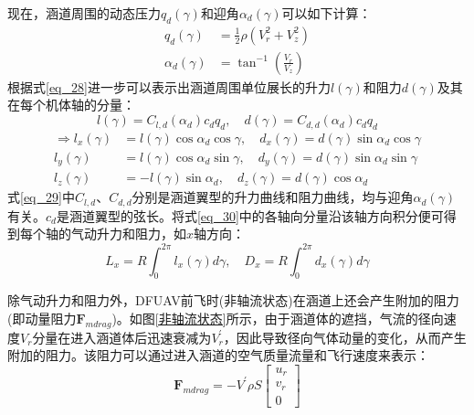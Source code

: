 现在，涵道周围的动态压力$q_d(\gamma)$和迎角$\alpha_d(\gamma)$可以如下计算：
\begin{equation}
    \begin{aligned}
        q_d(\gamma)&=\frac{1}{2}\rho\left(V_r^2+V_z^2\right)\\
        \alpha_d(\gamma)&=\tan^{-1}\left(\frac{V_r}{V_z}\right)
    \label{eq_28}
    \end{aligned}
\end{equation}
根据式\eqref{eq_28}进一步可以表示出涵道周围单位展长的升力$l(\gamma)$和阻力$d(\gamma)$及其在每个机体轴的分量：
\begin{equation}
        l(\gamma)=C_{l,d}(\alpha_d)c_dq_d, \quad
        d(\gamma)=C_{d,d}(\alpha_d)c_dq_d
    \label{eq_29}
\end{equation}
\begin{equation}
        \begin{aligned}
            \Rightarrow
        l_{x}(\gamma)&=l(\gamma)\cos\alpha_d\cos\gamma,\quad d_x(\gamma)=d(\gamma)\sin\alpha_d\cos\gamma \\
        l_{y}(\gamma)&=l(\gamma)\cos\alpha_d\sin\gamma,\quad d_y(\gamma)=d(\gamma)\sin\alpha_d\sin\gamma \\
        l_{z}(\gamma)&=-l(\gamma)\sin\alpha_d,\quad d_z(\gamma)=d(\gamma)\cos\alpha_d
        \label{eq_30}
    \end{aligned}
\end{equation}
式\eqref{eq_29}中$C_{l,d}$、$C_{d,d}$分别是涵道翼型的升力曲线和阻力曲线，均与迎角$\alpha_d(\gamma)$有关。$c_d$是涵道翼型的弦长。将式\eqref{eq_30}中的各轴向分量沿该轴方向积分便可得到每个轴的气动升力和阻力，如$x$轴方向：
\begin{equation}
    L_x=R\int_0^{2\pi}l_x(\gamma)d\gamma, \quad
    D_x=R\int_0^{2\pi}d_x(\gamma)d\gamma
    \label{eq_31}
\end{equation}

除气动升力和阻力外，DFUAV前飞时(非轴流状态)在涵道上还会产生附加的阻力(即动量阻力$\boldsymbol{F}_{mdrag}$\cite{choiStaticAnalysisSmall2012})。如图\ref{非轴流状态}所示，由于涵道体的遮挡，气流的径向速度$V_r$分量在进入涵道体后迅速衰减为$V_r^\prime$，因此导致径向气体动量的变化，从而产生附加的阻力。该阻力可以通过进入涵道的空气质量流量和飞行速度来表示：
\begin{equation}
    \boldsymbol{F}_{mdrag}=-V^\prime\rho{S}
    \begin{bmatrix}u_r \\v_r \\0
    \end{bmatrix}
    \label{eq_32}
\end{equation}

